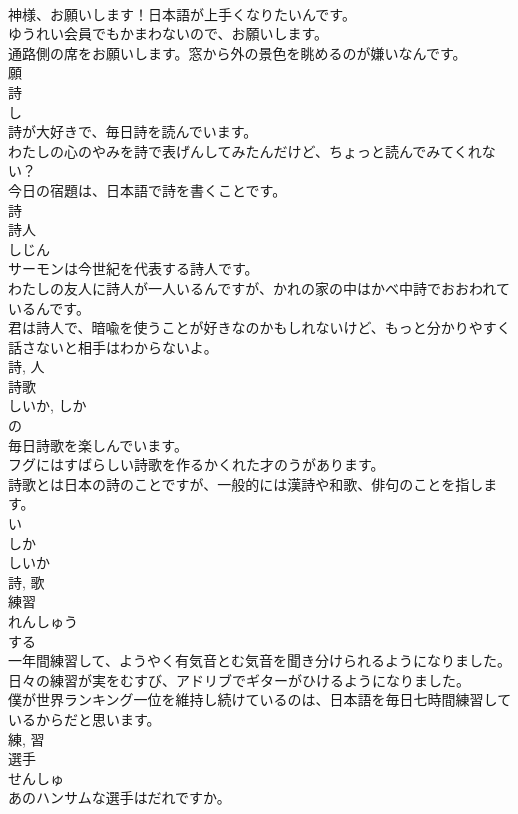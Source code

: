 \documentclass[8pt]{extreport}
\begin{document}
\begin{CJK}{UTF8}{min}
\\	神様、お願いします！日本語が上手くなりたいんです。	
\\	ゆうれい会員でもかまわないので、お願いします。	
\\	通路側の席をお願いします。窓から外の景色を眺めるのが嫌いなんです。	
\\	願	
\\	詩	
\\	し	
\\	詩が大好きで、毎日詩を読んでいます。	
\\	わたしの心のやみを詩で表げんしてみたんだけど、ちょっと読んでみてくれない？	
\\	今日の宿題は、日本語で詩を書くことです。	
\\	詩	
\\	詩人	
\\	しじん	
\\	サーモンは今世紀を代表する詩人です。	
\\	わたしの友人に詩人が一人いるんですが、かれの家の中はかべ中詩でおおわれているんです。	
\\	君は詩人で、暗喩を使うことが好きなのかもしれないけど、もっと分かりやすく話さないと相手はわからないよ。	
\\	詩, 人	
\\	詩歌	
\\	しいか, しか	
\\	の 
\\	毎日詩歌を楽しんでいます。	
\\	フグにはすばらしい詩歌を作るかくれた才のうがあります。	
\\	詩歌とは日本の詩のことですが、一般的には漢詩や和歌、俳句のことを指します。	
\\	い 
\\	しか 
\\	しいか 
\\	詩, 歌	
\\	練習	
\\	れんしゅう	
\\	する 
\\	一年間練習して、ようやく有気音とむ気音を聞き分けられるようになりました。	
\\	日々の練習が実をむすび、アドリブでギターがひけるようになりました。	
\\	僕が世界ランキング一位を維持し続けているのは、日本語を毎日七時間練習しているからだと思います。	
\\	練, 習	
\\	選手	
\\	せんしゅ	
\\	あのハンサムな選手はだれですか。	

\end{CJK}
\end{document}
